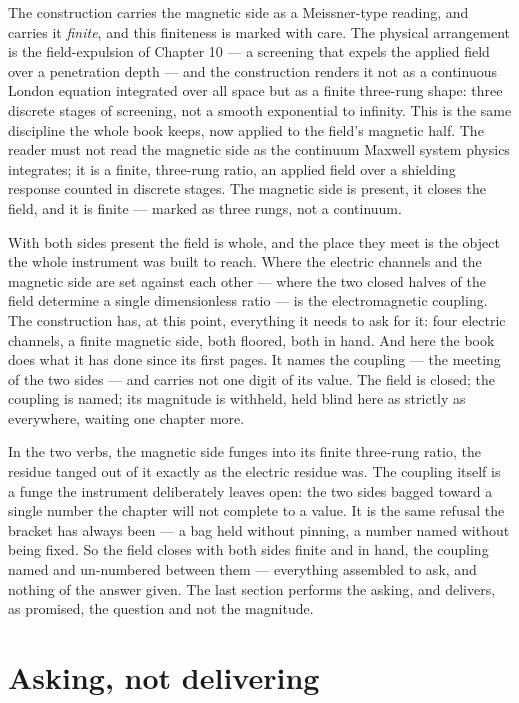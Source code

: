 The construction carries the magnetic side as a Meissner-type reading, and carries it \emph{finite}, and this finiteness is
marked with care. The physical arrangement is the field-expulsion of Chapter 10 --- a screening that expels the applied field
over a penetration depth --- and the construction renders it not as a continuous London equation integrated over all space
but as a finite three-rung shape: three discrete stages of screening, not a smooth exponential to infinity. This is the same
discipline the whole book keeps, now applied to the field's magnetic half. The reader must not read the magnetic side as the
continuum Maxwell system physics integrates; it is a finite, three-rung ratio, an applied field over a shielding response
counted in discrete stages. The magnetic side is present, it closes the field, and it is finite --- marked as three rungs,
not a continuum.

With both sides present the field is whole, and the place they meet is the object the whole instrument was built to reach.
Where the electric channels and the magnetic side are set against each other --- where the two closed halves of the field
determine a single dimensionless ratio --- is the electromagnetic coupling. The construction has, at this point, everything
it needs to ask for it: four electric channels, a finite magnetic side, both floored, both in hand. And here the book does
what it has done since its first pages. It names the coupling --- the meeting of the two sides --- and carries not one digit
of its value. The field is closed; the coupling is named; its magnitude is withheld, held blind here as strictly as
everywhere, waiting one chapter more.

In the two verbs, the magnetic side funges into its finite three-rung ratio, the residue tanged out of it exactly as the
electric residue was. The coupling itself is a funge the instrument deliberately leaves open: the two sides bagged toward a
single number the chapter will not complete to a value. It is the same refusal the bracket has always been --- a bag held
without pinning, a number named without being fixed. So the field closes with both sides finite and in hand, the coupling
named and un-numbered between them --- everything assembled to ask, and nothing of the answer given. The last section
performs the asking, and delivers, as promised, the question and not the magnitude.

\section{Asking, not delivering}

